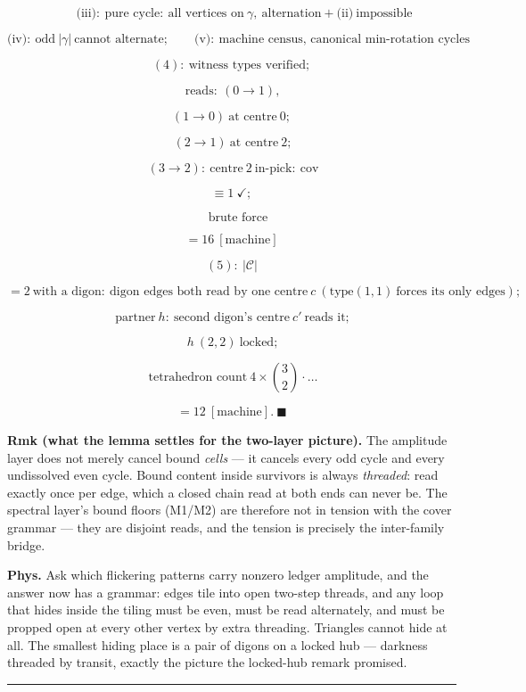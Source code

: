 \begin{theorem}
\[
\qquad \text{(iii)}:\ \text{pure cycle}:\ \text{all vertices on}\ \gamma,\ \text{alternation} + \text{(ii)}\ \text{impossible}
\]

\[
\text{(iv)}:\ \text{odd}\ |\gamma|\ \text{cannot alternate};\qquad\text{(v)}:\ \text{machine census, canonical min-rotation cycles}
\]

\[
(4):\ \text{witness types verified};
\]

\[
\ \text{reads}:\ (0{\to}1),
\]

\[
(1{\to}0)\ \text{at centre}\ 0;
\]

\[
\ (2{\to}1)\ \text{at centre}\ 2;
\]

\[
\ (3{\to}2):\ \text{centre}\ 2\ \text{in-pick}:\ \text{cov}
\]

\[
\equiv 1\ \checkmark;
\]

\[
\quad\text{brute force}
\]

\[
= 16\ [\text{machine}]
\]

\[
(5):\ |\mathcal C|
\]

\[
= 2\ \text{with a digon}:\ \text{digon edges both read by one centre}\ c\ (\text{type}(1,1)\ \text{forces its only edges});
\]

\[
\ \text{partner}\ h:\ \text{second digon's centre}\ c'\ \text{reads it};
\]

\[
\ h\ (2,2)\ \text{locked};
\]

\[
\ \text{tetrahedron count}\ 4\times\binom32\cdot\ldots
\]

\[
= 12\ [\text{machine}].\ \blacksquare
\]

\textbf{Rmk (what the lemma settles for the two-layer picture).} The amplitude layer does not merely cancel bound \textit{cells} — it cancels every odd cycle and every undissolved even cycle. Bound content inside survivors is always \textit{threaded}: read exactly once per edge, which a closed chain read at both ends can never be. The spectral layer's bound floors (M1/M2) are therefore not in tension with the cover grammar — they are disjoint reads, and the tension is precisely the inter-family bridge.

\textbf{Phys.} Ask which flickering patterns carry nonzero ledger amplitude, and the answer now has a grammar: edges tile into open two-step threads, and any loop that hides inside the tiling must be even, must be read alternately, and must be propped open at every other vertex by extra threading. Triangles cannot hide at all. The smallest hiding place is a pair of digons on a locked hub — darkness threaded by transit, exactly the picture the locked-hub remark promised.

\vspace{2pt}\noindent\rule{\textwidth}{0.4pt}\vspace{2pt}

\end{theorem}

